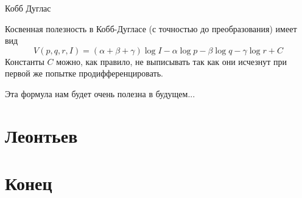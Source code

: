 \documentclass{beamer}
\begin{document}
\begin{frame}{Кобб Дуглас}

Косвенная полезность в Кобб-Дугласе (с точностью до преобразования) имеет вид
$$V(p,q,r,I) = (\alpha + \beta + \gamma) \log I - \alpha \log p - \beta \log q - \gamma \log r + C $$
Константы $C$ можно, как правило, не выписывать так как они исчезнут при первой же попытке продифференцировать.

Эта формула нам будет очень полезна в будущем...
\end{frame}

\section{Леонтьев}

\section{Конец}
\end{document}
